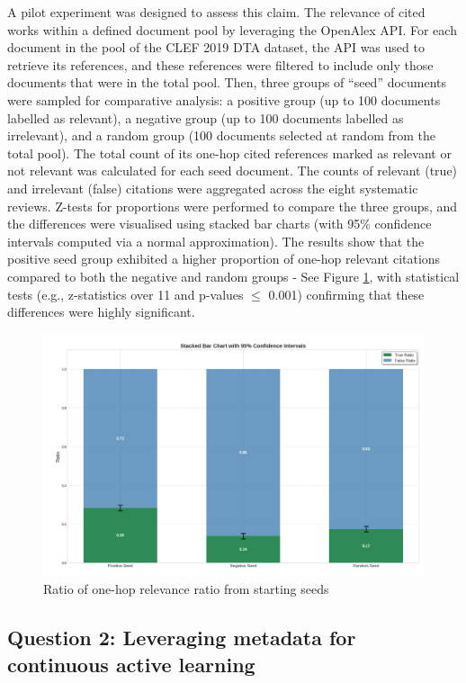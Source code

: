 \documentclass[10pt,oneside]{book}
\begin{document}
A pilot experiment was designed to assess this claim. The relevance of cited works within a defined document pool by leveraging the OpenAlex API. For each document in the pool of the CLEF 2019 DTA dataset, the API was used to retrieve its references, and these references were filtered to include only those documents that were in the total pool. Then, three groups of ``seed” documents were sampled for comparative analysis: a positive group (up to 100 documents labelled as relevant), a negative group (up to 100 documents labelled as irrelevant), and a random group (100 documents selected at random from the total pool). The total count of its one-hop cited references marked as relevant or not relevant was calculated for each seed document. The counts of relevant (true) and irrelevant (false) citations were aggregated across the eight systematic reviews. Z-tests for proportions were performed to compare the three groups, and the differences were visualised using stacked bar charts (with 95\% confidence intervals computed via a normal approximation). The results show that the positive seed group exhibited a higher proportion of one-hop relevant citations compared to both the negative and random groups - See Figure \ref{fig:bcs_experiement}, with statistical tests (e.g., z-statistics over 11 and p-values $\leq$ 0.001) confirming that these differences were highly significant.

\begin{figure}
    \centering
    \includegraphics[width=1\linewidth]{Confirmation Review//images/bcs_experiment.png}
    \caption{Ratio of one-hop relevance ratio from starting seeds}
    \label{fig:bcs_experiement}
\end{figure}


\subsection{Question 2: Leveraging metadata for continuous active learning}
\end{document}
